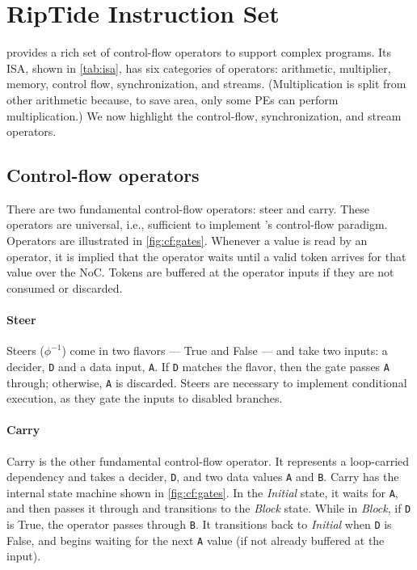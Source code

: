 \section{RipTide Instruction Set}
\label{riptide:cf}

\riptide provides a rich set of control-flow operators to support complex programs.
% 
Its ISA, shown in \autoref{tab:isa}, has six categories of operators: arithmetic, multiplier, memory, control flow, synchronization, and streams.
%
(Multiplication is split from other arithmetic because, to save area, only some PEs can perform multiplication.)
%
We now highlight the control-flow, synchronization, and stream operators.

\subsection{Control-flow operators}
There are two fundamental control-flow operators: steer and carry.
% 
These operators are universal, i.e., sufficient to implement \riptide's control-flow paradigm.
%
Operators are illustrated in \autoref{fig:cf:gates}.
%
Whenever a value is read by an operator, it is implied that the
operator waits until a valid token arrives for that value over the
NoC. Tokens are buffered at the operator inputs if they are not
consumed or discarded.

\figRipTideISA

\paragraph{Steer} 
Steers ($\phi^{-1}$) come in two flavors --- True and False --- and take two inputs: a decider, {\tt D} and a data input, {\tt A}.
% 
If {\tt D} matches the flavor, then the gate passes {\tt A} through; otherwise, {\tt A} is discarded.
% 
Steers are necessary to implement conditional execution, as they gate the inputs to disabled branches.

\paragraph{Carry}
Carry is the other fundamental control-flow operator.
% 
It represents a loop-carried dependency and takes a decider, {\tt D}, and two data values {\tt A} and {\tt B}.
% 
Carry has the internal state machine shown in \autoref{fig:cf:gates}.
%
In the {\em Initial} state, it waits for {\tt A}, and then passes it through and transitions to the {\em Block} state.
%
While in {\em Block}, if {\tt D} is True, the operator passes through {\tt B}.
%
It transitions back to {\em Initial} when {\tt D} is False, and begins waiting for the next {\tt A} value (if not already buffered at the input).

